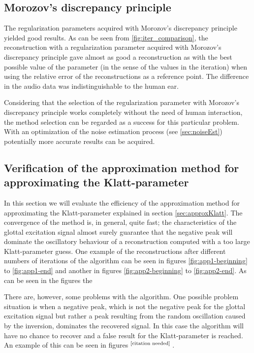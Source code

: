 \documentclass[12pt,a4]{article}
\newcommand{\citeneeded}{\ensuremath{\vphantom{1}^{\text{[citation needed]}}\,}}
\begin{document}
\subsection{Morozov's discrepancy principle}
\label{sec:morozow}

The regularization parameters acquired with Morozov's discrepancy principle
yielded good results. As can be seen from \cref{fig:iter_comparison}, the reconstruction with a regularization parameter acquired with Morozov's discrepancy principle gave almost as good a reconstruction as with the best possible value of the parameter (in the sense of the values in the iteration) when using the relative error of the reconstructions as a reference point. The difference in the audio data was indistinguishable to the human ear.

Considering that the selection of the regularization parameter with Morozov's discrepancy principle works completely without the need of human interaction, the method selection can be regarded as a success for this particular problem. With an optimization of the noise estimation process (see \ref{sec:noiseEst}) potentially more accurate results can be acquired.

\subsection{Verification of the approximation method for \\approximating the Klatt-parameter}

In this section we will evaluate the efficiency of the approximation method for approximating the Klatt-parameter explained in section \ref{sec:approxKlatt}. The convergence of the method is, in general, quite fast; the characteristics of the glottal excitation signal almost surely guarantee that the negative peak will dominate the oscillatory behaviour of a reconstruction computed with a too large Klatt-parameter guess.
One example of the reconstructions after different numbers of iterations of the algorithm can be seen in figures \ref{fig:app1-beginning} to \ref{fig:app1-end} and another in figures \ref{fig:app2-beginning} to \ref{fig:app2-end}. As can be seen in the figures the 

There are, however, some problems with the algorithm. One possible problem situation is when a negative peak, which is not the negative peak for the glottal excitation signal but rather a peak resulting from the random oscillation caused by the inversion, dominates the recovered signal. In this case the algorithm will have no chance to recover and a false result for the Klatt-parameter is reached. An example of this can be seen in figures \citeneeded.
\end{document}
